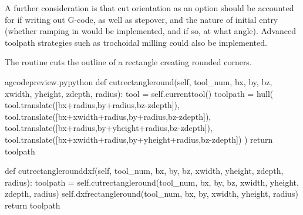 \documentclass{ltxdoc}
\begin{document}
A further consideration is that cut orientation as an option should be accounted for if writing out G-code, as well as stepover, and the nature of initial entry (whether ramping in would be implemented, and if so, at what angle). Advanced toolpath strategies such as trochoidal milling could also be implemented.

The routine  cuts the outline of a rectangle creating rounded corners.

\lstset{firstnumber=\thegcpy}
\begin{writecode}{a}{gcodepreview.py}{python}
    def cutrectangleround(self, tool_num, bx, by, bz, xwidth, yheight, zdepth, radius):
        tool = self.currenttool()
        toolpath = hull(
            tool.translate([bx+radius,by+radius,bz-zdepth]),
            tool.translate([bx+xwidth+radius,by+radius,bz-zdepth]),
            tool.translate([bx+radius,by+yheight+radius,bz-zdepth]),
            tool.translate([bx+xwidth+radius,by+yheight+radius,bz-zdepth])
            )
        return toolpath

    def cutrectanglerounddxf(self, tool_num, bx, by, bz, xwidth, yheight, zdepth, radius):
        toolpath = self.cutrectangleround(tool_num, bx, by, bz, xwidth, yheight, zdepth, radius)
        self.dxfrectangleround(tool_num, bx, by, xwidth, yheight, radius)
        return toolpath

\end{writecode}
\addtocounter{gcpy}{15}
\end{document}
